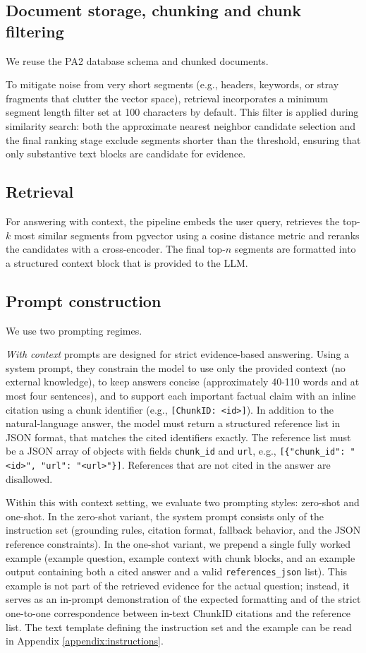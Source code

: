 \documentclass[conference]{IEEEtran}
\begin{document}
\subsection{Document storage, chunking and chunk filtering}
We reuse the PA2 database schema and chunked documents.

To mitigate noise from very short segments (e.g., headers, keywords, or stray fragments that clutter the vector space), retrieval incorporates a minimum segment length filter set at 100 characters by default. This filter is applied during similarity search: both the approximate nearest neighbor candidate selection and the final ranking stage exclude segments shorter than the threshold, ensuring that only substantive text blocks are candidate for evidence.

\subsection{Retrieval}
For answering with context, the pipeline embeds the user query, retrieves the top-$k$ most similar segments from pgvector using a cosine distance metric and reranks the candidates with a cross-encoder. The final top-$n$ segments are formatted into a structured context block that is provided to the LLM.


\subsection{Prompt construction}
We use two prompting regimes.

\textit{With context} prompts are designed for strict evidence-based answering. Using a system prompt, they constrain the model to use only the provided context (no external knowledge), to keep answers concise (approximately 40-110 words and at most four sentences), and to support each important factual claim with an inline citation using a chunk identifier (e.g., \texttt{[ChunkID: <id>]}). In addition to the natural-language answer, the model must return a structured reference list in JSON format, that matches the cited identifiers exactly. The reference list must be a JSON array of objects with fields \texttt{chunk\_id} and \texttt{url}, e.g., \verb|[{"chunk_id": "<id>", "url": "<url>"}]|. References that are not cited in the answer are disallowed.

Within this with context setting, we evaluate two prompting styles:
zero-shot and one-shot. In the zero-shot variant, the system prompt consists only of the instruction set (grounding rules, citation format, fallback behavior, and the JSON reference constraints). In the one-shot variant, we prepend a single fully worked example (example question, example context with chunk blocks, and an example output containing both a cited answer and a valid \texttt{references\_json} list). This example is not part of the retrieved evidence for the actual question; instead, it serves as an in-prompt demonstration of the expected formatting and of the strict one-to-one correspondence between in-text ChunkID citations and the reference list. The text template defining the instruction set and the example can be read in Appendix \ref{appendix:instructions}.
\end{document}
